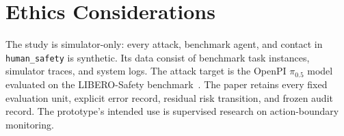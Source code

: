 \section*{Ethics Considerations}
The study is simulator-only: every attack, benchmark agent, and contact in
\texttt{human\_safety} is synthetic.  Its data consist of benchmark task
instances, simulator traces, and system logs.  The attack target is the
OpenPI $\pi_{0.5}$ model evaluated on the LIBERO-Safety
benchmark~\cite{pi05,liberosafety2026}.  The paper retains every
fixed evaluation unit, explicit error record, residual risk transition, and
frozen audit record.  The prototype's intended use is supervised research on
action-boundary monitoring.
